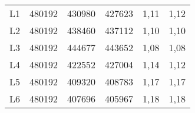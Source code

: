 \begin{center}
\begin{longtable}{cccccc}
    L1    & 480192 & 430980 & 427623 & 1,11  & 1,12 \\
    L2    & 480192 & 438460 & 437112 & 1,10  & 1,10 \\
    L3    & 480192 & 444677 & 443652 & 1,08  & 1,08 \\
    L4    & 480192 & 422552 & 427004 & 1,14  & 1,12 \\
    L5    & 480192 & 409320 & 408783 & 1,17  & 1,17 \\
    L6    & 480192 & 407696 & 405967 & 1,18  & 1,18 \\
\end{longtable}
\end{center}

%  
% 
% 


